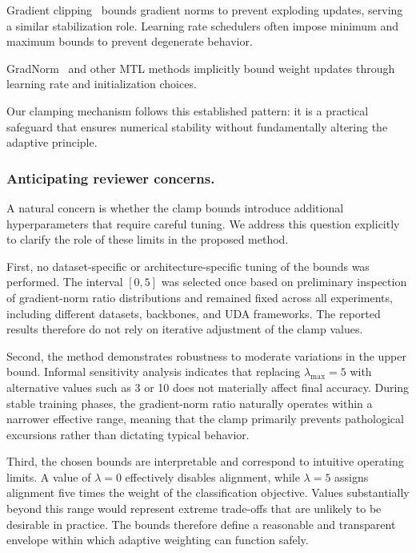\documentclass[pdflatex,sn-mathphys-num]{sn-jnl}
\theoremstyle{thmstyleone}
\theoremstyle{thmstyletwo}
\theoremstyle{thmstylethree}
\begin{document}
Gradient clipping~\cite{pascanu2013difficulty} bounds gradient norms to prevent exploding updates, serving a similar stabilization role.
Learning rate schedulers often impose minimum and maximum bounds to prevent degenerate behavior.  

GradNorm~\cite{chen2018gradnorm} and other MTL methods implicitly bound weight updates through learning rate and initialization choices.

Our clamping mechanism follows this established pattern: it is a practical safeguard that ensures numerical stability without fundamentally altering the adaptive principle.

\subsubsection{Anticipating reviewer concerns.}

A natural concern is whether the clamp bounds introduce additional hyperparameters that require careful tuning. We address this question explicitly to clarify the role of these limits in the proposed method.

First, no dataset-specific or architecture-specific tuning of the bounds was performed. The interval $[0, 5]$ was selected once based on preliminary inspection of gradient-norm ratio distributions and remained fixed across all experiments, including different datasets, backbones, and UDA frameworks. The reported results therefore do not rely on iterative adjustment of the clamp values.

Second, the method demonstrates robustness to moderate variations in the upper bound. Informal sensitivity analysis indicates that replacing $\lambda_{\max} = 5$ with alternative values such as 3 or 10 does not materially affect final accuracy. During stable training phases, the gradient-norm ratio naturally operates within a narrower effective range, meaning that the clamp primarily prevents pathological excursions rather than dictating typical behavior.

Third, the chosen bounds are interpretable and correspond to intuitive operating limits. A value of $\lambda = 0$ effectively disables alignment, while $\lambda = 5$ assigns alignment five times the weight of the classification objective. Values substantially beyond this range would represent extreme trade-offs that are unlikely to be desirable in practice. The bounds therefore define a reasonable and transparent envelope within which adaptive weighting can function safely.
\end{document}
